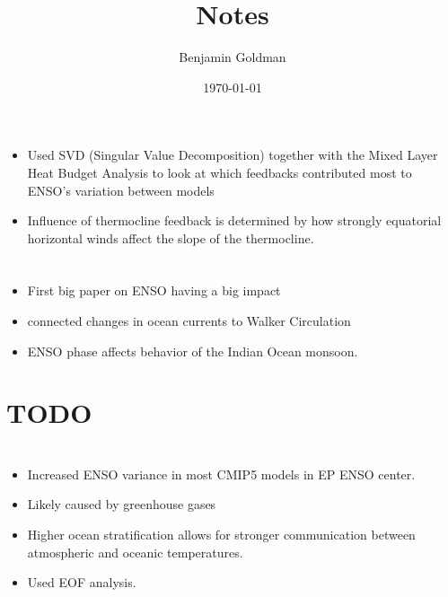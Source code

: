 \documentclass[11pt]{article}
\author{Benjamin Goldman}
\date{\today}
\title{Notes}
\begin{document}
\maketitle
\tableofcontents



\section{\cite{an2017feedback}}
\label{sec:org3655487}

\begin{itemize}
\item Used SVD (Singular Value Decomposition) together with the Mixed Layer Heat Budget Analysis to look at which feedbacks contributed most to ENSO's variation between models
\item Influence of thermocline feedback is determined by how strongly equatorial horizontal winds affect the slope of the thermocline.
\end{itemize}

\section{\cite{bjerknes1969atmospheric}}
\label{sec:org136b470}

\begin{itemize}
\item First big paper on ENSO having a big impact
\item connected changes in ocean currents to Walker Circulation
\item ENSO phase affects behavior of the Indian Ocean monsoon.
\end{itemize}

\section{{\bfseries\sffamily TODO} \cite{boer2000transient}}
\label{sec:org04662d3}

\section{\cite{cai2018increased}}
\label{sec:org328012a}

\begin{itemize}
\item Increased ENSO variance in most CMIP5 models in EP ENSO center.
\item Likely caused by greenhouse gases
\item Higher ocean stratification allows for stronger communication between atmospheric and oceanic temperatures.
\item Used EOF analysis.
\end{itemize}
\end{document}
